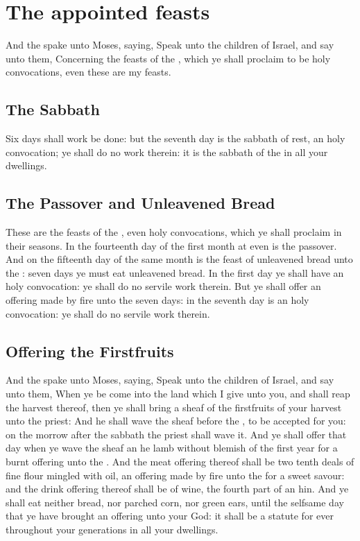 \section*{The appointed feasts}
\begin{biblechapter} %
\verse And the \LORD spake unto Moses, saying,
\verse Speak unto the children of Israel, and say unto them, Concerning the feasts of the \LORD, which ye shall proclaim to be holy convocations, even these are my feasts.
\subsection*{The Sabbath}
\verse Six days shall work be done: but the seventh day is the sabbath of rest, an holy convocation; ye shall do no work therein: it is the sabbath of the \LORD in all your dwellings.
\subsection*{The Passover and Unleavened Bread}
\verse These are the feasts of the \LORD, even holy convocations, which ye shall proclaim in their seasons.
\verse In the fourteenth day of the first month at even is the \LORDs passover.
\verse And on the fifteenth day of the same month is the feast of unleavened bread unto the \LORD: seven days ye must eat unleavened bread.
\verse In the first day ye shall have an holy convocation: ye shall do no servile work therein.
\verse But ye shall offer an offering made by fire unto the \LORD seven days: in the seventh day is an holy convocation: ye shall do no servile work therein.
\subsection*{Offering the Firstfruits}
\verse And the \LORD spake unto Moses, saying,
\verse Speak unto the children of Israel, and say unto them, When ye be come into the land which I give unto you, and shall reap the harvest thereof, then ye shall bring a sheaf of the firstfruits of your harvest unto the priest:
\verse And he shall wave the sheaf before the \LORD, to be accepted for you: on the morrow after the sabbath the priest shall wave it.
\verse And ye shall offer that day when ye wave the sheaf an he lamb without blemish of the first year for a burnt offering unto the \LORD.
\verse And the meat offering thereof shall be two tenth deals of fine flour mingled with oil, an offering made by fire unto the \LORD for a sweet savour: and the drink offering thereof shall be of wine, the fourth part of an hin.
\verse And ye shall eat neither bread, nor parched corn, nor green ears, until the selfsame day that ye have brought an offering unto your God: it shall be a statute for ever throughout your generations in all your dwellings.

\end{biblechapter}
